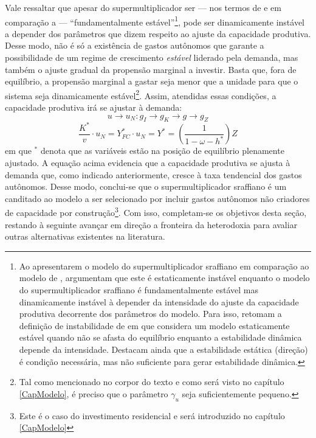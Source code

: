 Vale ressaltar que apesar do supermultiplicador ser --- nos termos de \textcite{hicks_capital_1965} e em comparação a \textcite{harrod_essay_1939} --- ``fundamentalmente estável''\footnote{
	Ao apresentarem o modelo do supermultiplicador sraffiano em comparação ao modelo de \textcite{harrod_essay_1939}, \textcite{serrano_trouble_2017} argumentam que este é estaticamente instável enquanto o modelo do supermultiplicador sraffiano é fundamentalmente estável mas dinamicamente instável à depender da intensidade do ajuste da capacidade produtiva decorrente dos parâmetros do modelo.
	Para isso, retomam a definição de instabilidade de  \textcite{hicks_capital_1965} em que considera um modelo estaticamente estável quando não se afasta do equilíbrio enquanto a estabilidade dinâmica depende da intensidade. Destacam ainda que a estabilidade estática (direção) é condição necessária, mas não suficiente para gerar estabilidade dinâmica.
}, pode ser dinamicamente instável a depender dos parâmetros que dizem respeito ao ajuste da capacidade produtiva. Desse modo, não é só a existência de gastos autônomos que garante a possibilidade de um regime de crescimento \textit{estável} liderado pela demanda, mas também o ajuste gradual da propensão marginal a investir. Basta que, fora de equilíbrio, a propensão marginal a gastar seja menor que a unidade para que o sistema seja dinamicamente estável\footnote{Tal como mencionado no corpor do texto e como será visto no capítulo \ref{CapModelo}, é preciso que o parâmetro $\gamma_u$ seja suficientemente pequeno.}. Assim, atendidas essas condições, a capacidade produtiva irá se ajustar à demanda:
$$
u \to u_N : g_I \to g_K \to g \to  g_Z
$$
$$
\frac{K^*}{v}\cdot u_N = Y_{FC}^*\cdot u_N = Y^* = \left(\frac{1}{1 - \omega - h^*}\right)Z
$$
em que $^*$ denota que as variáveis estão na posição de equilíbrio plenamente ajustado.
A equação acima evidencia que a capacidade produtiva se ajusta à demanda que, como indicado anteriormente, cresce à taxa tendencial dos gastos autônomos. 
Desse modo, conclui-se que o supermultiplicador sraffiano é um canditado ao modelo a ser selecionado por incluir gastos autônomos não criadores de capacidade por construção\footnote{
	Este é o caso do investimento residencial e será introduzido no capítulo \ref{CapModelo} 
}.
Com isso, completam-se os objetivos desta seção, restando à seguinte avançar em direção a fronteira da heterodoxia para avaliar outras alternativas existentes na literatura.





